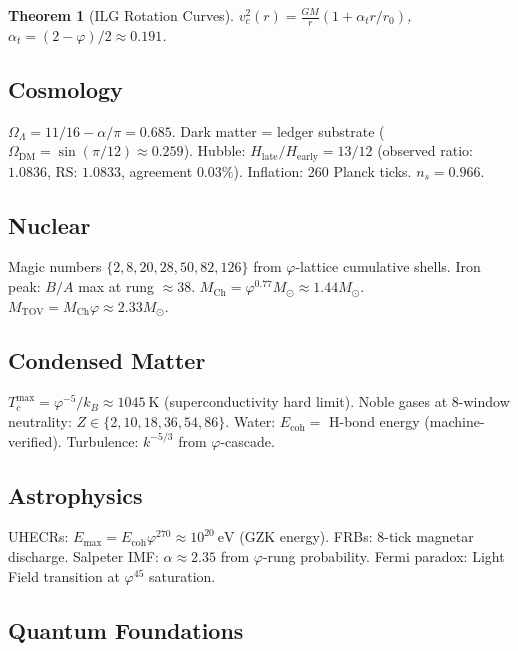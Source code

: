 \documentclass[12pt,a4paper]{article}
\newtheorem{theorem}{Theorem}[section]
\theoremstyle{definition}
\theoremstyle{remark}
\begin{document}
\begin{theorem}[ILG Rotation Curves]
$v_c^2(r) = \frac{GM}{r}(1 + \alpha_t r/r_0)$, $\alpha_t = (2-\varphi)/2 \approx 0.191$.
\end{theorem}

\subsection{Cosmology}

$\Omega_\Lambda = 11/16 - \alpha/\pi = 0.685$. Dark matter = ledger substrate 
($\Omega_\mathrm{DM} = \sin(\pi/12) \approx 0.259$).
Hubble: $H_\mathrm{late}/H_\mathrm{early} = 13/12$ (observed ratio: $1.0836$, 
RS: $1.0833$, agreement $0.03\%$).
Inflation: 260 Planck ticks. $n_s = 0.966$.

\subsection{Nuclear}

Magic numbers $\{2,8,20,28,50,82,126\}$ from $\varphi$-lattice cumulative shells.
Iron peak: $B/A$ max at rung $\approx 38$. $M_\mathrm{Ch} = \varphi^{0.77}M_\odot \approx 1.44M_\odot$.
$M_\mathrm{TOV} = M_\mathrm{Ch}\varphi \approx 2.33M_\odot$.

\subsection{Condensed Matter}

$T_c^\mathrm{max} = \varphi^{-5}/k_B \approx 1045~\mathrm{K}$ (superconductivity hard limit).
Noble gases at 8-window neutrality: $Z \in \{2,10,18,36,54,86\}$.
Water: $E_\mathrm{coh} = $ H-bond energy (machine-verified).
Turbulence: $k^{-5/3}$ from $\varphi$-cascade.

\subsection{Astrophysics}

UHECRs: $E_\mathrm{max} = E_\mathrm{coh}\varphi^{270} \approx 10^{20}~\mathrm{eV}$ (GZK energy).
FRBs: 8-tick magnetar discharge.
Salpeter IMF: $\alpha \approx 2.35$ from $\varphi$-rung probability.
Fermi paradox: Light Field transition at $\varphi^{45}$ saturation.

\subsection{Quantum Foundations}
\end{document}
